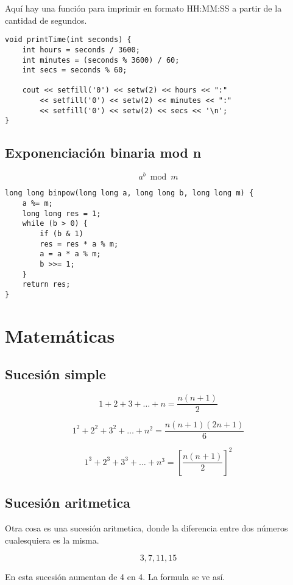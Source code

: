 \documentclass[11pt]{article}
\begin{document}
Aquí hay una función para imprimir en formato HH:MM:SS a partir de la cantidad de segundos.

\begin{lstlisting}
void printTime(int seconds) {
    int hours = seconds / 3600;
    int minutes = (seconds % 3600) / 60;
    int secs = seconds % 60;
        
    cout << setfill('0') << setw(2) << hours << ":"
        << setfill('0') << setw(2) << minutes << ":"
        << setfill('0') << setw(2) << secs << '\n';
}
\end{lstlisting}

\subsection{Exponenciación binaria mod n}

\[ a^b \bmod m \]

\begin{lstlisting}
long long binpow(long long a, long long b, long long m) {
    a %= m;
    long long res = 1;
    while (b > 0) {
        if (b & 1)
        res = res * a % m;
        a = a * a % m;
        b >>= 1;
    }
    return res;
}
\end{lstlisting}

\section{Matemáticas}

\subsection{Sucesión simple}

\[ 1 + 2 + 3 + \dots + n = \frac{n(n + 1)}{2} \]

\[ 1^2 + 2^2 + 3^2 + \dots + n^2 = \frac{n(n + 1)(2n + 1)}{6} \]

\[ 1^3 + 2^3 + 3^3 + \dots + n^3 = \left[\frac{n(n + 1)}{2}\right]^2 \]

\subsection{Sucesión aritmetica}

Otra cosa es una sucesión aritmetica, donde la diferencia entre dos números cualesquiera es la misma.

\[ 3, 7, 11, 15 \]

En esta sucesión aumentan de 4 en 4. La formula se ve así.
\end{document}
